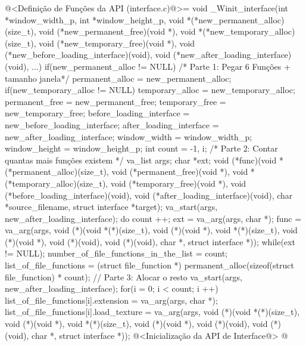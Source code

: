 \iniciocodigo
@<Definição de Funções da API (interface.c)@>=
void _Winit_interface(int *window_width_p, int *window_height_p,
                      void *(*new_permanent_alloc)(size_t),
                      void (*new_permanent_free)(void *),
                      void *(*new_temporary_alloc)(size_t),
                      void (*new_temporary_free)(void *),
                      void (*new_before_loading_interface)(void),
                      void (*new_after_loading_interface)(void), ...){
  if(new_permanent_alloc != NULL) /* Parte 1: Pegar 6 Funções + tamanho janela*/
    permanent_alloc = new_permanent_alloc;
  if(new_temporary_alloc != NULL)
    temporary_alloc = new_temporary_alloc;
  permanent_free = new_permanent_free;
  temporary_free = new_temporary_free;
  before_loading_interface = new_before_loading_interface;
  after_loading_interface = new_after_loading_interface;
  window_width = window_width_p;
  window_height = window_height_p;
  {
    int count = -1, i; /* Parte 2: Contar quantas mais funções existem */
    va_list args;
    char *ext;
    void (*func)(void *(*permanent_alloc)(size_t),
                 void (*permanent_free)(void *), void *(*temporary_alloc)(size_t),
                 void (*temporary_free)(void *),
                 void (*before_loading_interface)(void),
                 void (*after_loading_interface)(void),
                 char *source_filename, struct interface *target);
    va_start(args, new_after_loading_interface);
    do{
      count ++;
      ext = va_arg(args, char *);
      func = va_arg(args, void (*)(void *(*)(size_t), void (*)(void *),
                                   void *(*)(size_t), void (*)(void *),
                                   void (*)(void), void (*)(void),
                                   char *, struct interface *)); 
    } while(ext != NULL);
    number_of_file_functions_in_the_list = count;
    list_of_file_functions = (struct file_function *)
                               permanent_alloc(sizeof(struct file_function) * 
                                               count); // Parte 3: Alocar o resto
    va_start(args, new_after_loading_interface);
    for(i = 0; i < count; i ++){
      list_of_file_functions[i].extension = va_arg(args, char *);
      list_of_file_functions[i].load_texture =
             va_arg(args, void (*)(void *(*)(size_t), void (*)(void *),
                                   void *(*)(size_t), void (*)(void *),
                                   void (*)(void), void (*)(void),
                                   char *, struct interface *));
    }
  }
  @<Inicialização da API de Interface@>
}
@
\fimcodigo

